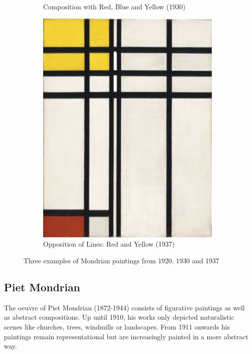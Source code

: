 \documentclass[serif,article,noparskip]{agse-thesis}
\begin{document}
\begin{figure}
\begin{subfigure}{.3\textwidth}
  \caption{Composition with Red, Blue and Yellow (1930)}
  \label{fig:sub2}
\end{subfigure}
\begin{subfigure}{.3\textwidth}
  \centering
  \includegraphics[width=\linewidth]{images/B273.jpg}
  \caption{Opposition of Lines: Red and Yellow (1937)}
  \label{fig:sub3}
\end{subfigure}
\caption{Three examples of Mondrian paintings from 1920, 1930 and 1937}
\label{fig:mondrian}
\end{figure}

\subsection{Piet Mondrian}

The oeuvre of Piet Mondrian (1872-1944) consists of figurative paintings as well
as abstract compositions. Up until 1910, his works only depicted naturalistic
scenes like churches, trees, windmills or landscapes. From 1911 onwards his
paintings remain representational but are increasingly painted in a more
abstract way.
\end{document}
